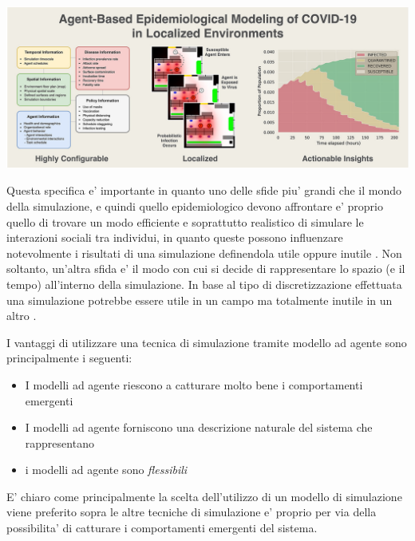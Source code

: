 \begin{minipage}{\linewidth}
    \centering
    \includegraphics{img/1-s2.0-S0010482522001883-ga1.jpg}
    \label{fig:abm_covid}
\end{minipage}

Questa specifica e' importante in quanto uno delle sfide piu' grandi che 
il mondo della simulazione, e quindi quello epidemiologico devono affrontare
e' proprio quello di trovare un modo efficiente e soprattutto realistico 
di simulare le interazioni sociali tra individui, in quanto queste possono
influenzare notevolmente i risultati di una simulazione definendola utile
oppure inutile \cite{Silverman2021}. Non soltanto, un'altra sfida e' il modo 
con cui si decide di rappresentare lo spazio (e il tempo) all'interno della
simulazione. In base al tipo di discretizzazione effettuata una simulazione
potrebbe essere utile in un campo ma totalmente inutile in un altro 
\cite{KONSTANTINOUDIS2020100319}.

I vantaggi di utilizzare una tecnica di simulazione tramite modello ad agente
sono principalmente i seguenti:
\begin{itemize}
    \item I modelli ad agente riescono a catturare molto bene i comportamenti emergenti
    \item I modelli ad agente forniscono una descrizione naturale del sistema che rappresentano 
    \item i modelli ad agente sono \emph{flessibili}
\end{itemize}
E' chiaro come principalmente la scelta dell'utilizzo di un modello di simulazione viene preferito 
sopra le altre tecniche di simulazione e' proprio per via della possibilita' di catturare i 
comportamenti emergenti del sistema.


